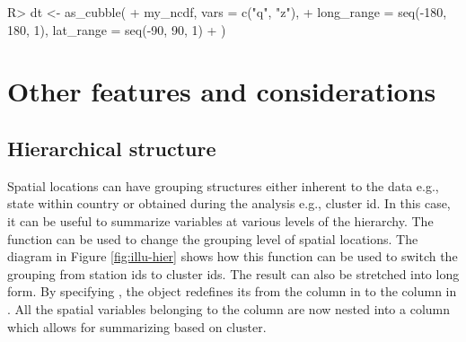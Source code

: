 \documentclass[
  shortnames]{jss}
\begin{document}
\begin{CodeChunk}
\begin{CodeInput}
R> dt <- as_cubble(
+   my_ncdf, vars = c("q", "z"),
+   long_range = seq(-180, 180, 1), lat_range = seq(-90, 90, 1)
+   )
\end{CodeInput}
\end{CodeChunk}

\hypertarget{others}{%
\section{Other features and considerations}\label{others}}

\hypertarget{hierarchical-structure}{%
\subsection{Hierarchical structure}\label{hierarchical-structure}}

Spatial locations can have grouping structures either inherent to the data e.g., state within country or obtained during the analysis e.g., cluster id. In this case, it can be useful to summarize variables at various levels of the hierarchy. The function  can be used to change the grouping level of spatial locations. The diagram in Figure \ref{fig:illu-hier} shows how this function can be used to switch the grouping from station ids to cluster ids. The result can also be stretched into long form. By specifying , the  object redefines its  from the  column in  to the  column in . All the spatial variables belonging to the  column are now nested into a  column which allows for summarizing based on cluster.
\end{document}
